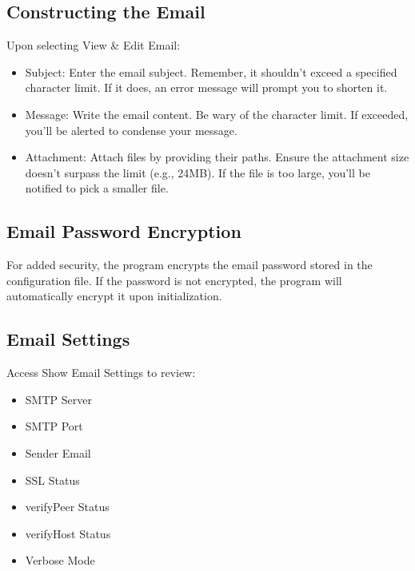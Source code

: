 \documentclass{article}
\begin{document}
	\subsection*{Constructing the Email}
	Upon selecting View \& Edit Email:
	\begin{itemize}
		\item Subject: Enter the email subject. Remember, it shouldn't exceed a specified character limit. If it does, an error message will prompt you to shorten it.
		\item Message: Write the email content. Be wary of the character limit. If exceeded, you'll be alerted to condense your message.
		\item Attachment: Attach files by providing their paths. Ensure the attachment size doesn't surpass the limit (e.g., 24MB). If the file is too large, you'll be notified to pick a smaller file.
	\end{itemize}
	
	\subsection*{Email Password Encryption}
	For added security, the program encrypts the email password stored in the configuration file. If the password is not encrypted, the program will automatically encrypt it upon initialization. 
	
	\subsection*{Email Settings}
	Access Show Email Settings to review:
	\begin{itemize}
		\item SMTP Server
		\item SMTP Port
		\item Sender Email
		\item SSL Status
		\item verifyPeer Status
		\item verifyHost Status
		\item Verbose Mode
	\end{itemize}
\end{document}
